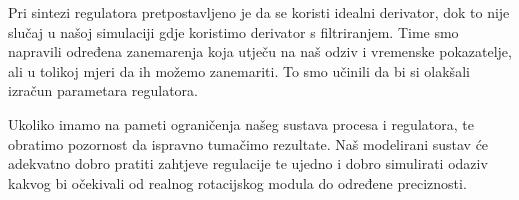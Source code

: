 \documentclass[12pt,a4paper]{article}
\begin{document}
Pri sintezi regulatora pretpostavljeno je da se koristi idealni derivator, dok to nije slučaj u našoj simulaciji gdje koristimo derivator s filtriranjem. Time smo napravili određena zanemarenja koja utječu na naš odziv i vremenske pokazatelje, ali u tolikoj mjeri da ih možemo zanemariti. To smo učinili da bi si olakšali izračun parametara regulatora.


Ukoliko imamo na pameti ograničenja našeg sustava procesa i regulatora, te obratimo pozornost da ispravno tumačimo rezultate. Naš modelirani sustav će adekvatno dobro pratiti zahtjeve regulacije te ujedno i dobro simulirati odaziv kakvog bi očekivali od realnog rotacijskog modula do određene preciznosti.
\end{document}
